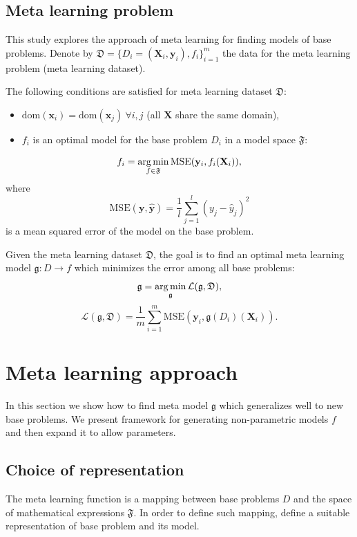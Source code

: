 \documentclass[12pt]{article}
\begin{document}
\subsection{Meta learning problem}
This study explores the approach of meta learning for finding models of base problems.
Denote by $\mathfrak{D} = \{D_i = (\mathbf{X}_i, \mathbf{y}_i), f_i\}_{i=1}^m$ the data for the meta learning problem (meta learning dataset).

The following conditions are satisfied for meta learning dataset $\mathfrak{D}$:
\begin{itemize}
  \item $\text{dom}(\mathbf{x}_i) = \text{dom}(\mathbf{x}_j) \ \forall i, j$ (all $\mathbf{X}$ share the same domain),
  \item $f_i$ is an optimal model for the base problem $D_i$ in a model space $\mathfrak{F}$:
\end{itemize}
\begin{equation}
  f_i = \mathop{\arg \min}\limits_{f \in \mathfrak{F}} \text{MSE} (\mathbf{y}_i, f_i(\mathbf{X}_i)),
\end{equation}
where
\begin{equation}
  \text{MSE}(\mathbf{y}, \hat{\mathbf{y}}) = \frac{1}{l} \sum_{j=1}^{l} (y_j - \hat{y}_j)^2
\end{equation}
is a mean squared error of the model on the base problem.

Given the meta learning dataset $\mathfrak{D}$, the goal is to find an optimal meta learning model $\mathfrak{g}: D \rightarrow f$ which minimizes the error among all base problems:
\begin{equation}
  \mathfrak{g} = \mathop{\arg \min}\limits_{\mathfrak{g}} \mathcal{L}(\mathfrak{g}, \mathfrak{D}),
\end{equation}
\begin{equation}
  \label{error}
  \mathcal{L}(\mathfrak{g}, \mathfrak{D}) = \frac{1}{m} \sum_{i=1}^m \text{MSE}(\mathbf{y}_i, \mathfrak{g}(D_i)(\mathbf{X}_i)).
\end{equation}
\newpage

\section{Meta learning approach}
In this section we show how to find meta model $\mathfrak{g}$ which generalizes well to new base problems. We present framework for generating non-parametric models $f$ and then expand it to allow parameters.

\subsection{Choice of representation}
The meta learning function is a mapping between base problems $D$ and the space of mathematical expressions $\mathfrak{F}$. In order to define such mapping, define a suitable representation of base problem and its model.
\end{document}
